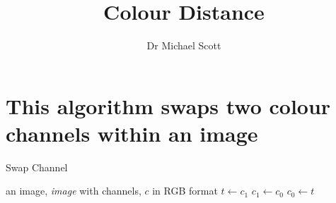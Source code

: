 \documentclass{../../../fal_assignment}
\title{Colour Distance}
\author{Dr Michael Scott}
\begin{document}
\maketitle

	\section{This algorithm swaps two colour channels within an image}
	
	\begin{algorithm}[ht]
		\caption{Swap Channel}
		\label{alg:algorithm}
		
		\begin{algorithmic}[1]
			\Require an image, \textit{image} with channels, $c$ in RGB format
			 \State $t \leftarrow c_{1}$
			 \State $c_{1}  \leftarrow c_{0}$
			 \State $c_{0} \leftarrow t$
			\EndFor
			\EndProcedure
		\end{algorithmic}
	\end{algorithm}
\end{document}
